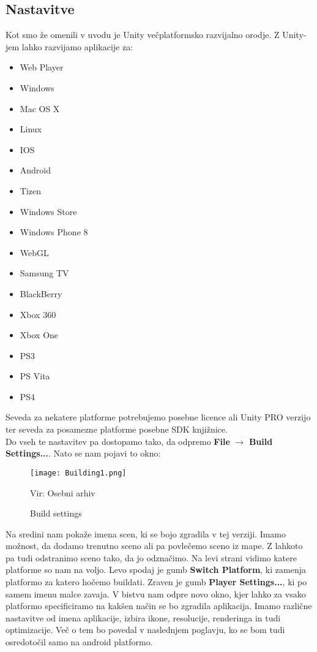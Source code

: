 {\color{indiagreen}\subsection{Nastavitve}}
Kot smo že omenili v uvodu je Unity večplatformsko razvijalno orodje. Z Unity-jem lahko razvijamo aplikacije za:
\begin{itemize}
	\item Web Player
	\item Windows
	\item Mac OS X
	\item Linux
	\item IOS
	\item Android
	\item Tizen
	\item Windows Store
	\item Windows Phone 8
	\item WebGL
	\item Samsung TV
	\item BlackBerry
	\item Xbox 360
	\item Xbox One
	\item PS3
	\item PS Vita
	\item PS4
\end{itemize}
Seveda za nekatere platforme potrebujemo posebne licence ali Unity PRO verzijo ter seveda za posamezne platforme posebne SDK knjižnice.\\
Do vseh te nastavitev pa dostopamo tako, da odpremo \textbf{File} $\rightarrow$ \textbf{Build Settings...}. Nato se nam pojavi to okno:\\
\begin{figure}[ht!]
	\centering
	\texttt{[image: Building1.png]}
	\caption{Build settings}
	{\tiny Vir: Osebni arhiv}
\end{figure}
Na sredini nam pokaže imena scen, ki se bojo zgradila v tej verziji. Imamo možnost, da dodamo trenutno sceno ali pa povlečemo sceno iz mape. Z lahkoto pa tudi odstranimo sceno tako, da jo odznačimo. Na levi strani vidimo katere platforme so nam na voljo. Levo spodaj je gumb \textbf{Switch Platform}, ki zamenja platformo za katero hočemo buildati. Zraven je gumb \textbf{Player Settings...}, ki po samem imenu malce zavaja. V bistvu nam odpre novo okno, kjer lahko za vsako platformo specificiramo na kakšen način se bo zgradila aplikacija. Imamo različne nastavitve od imena aplikacije, izbira ikone, resolucije, renderinga in tudi optimizacije. Več o tem bo povedal v naslednjem poglavju, ko se bom tudi osredotočil samo na android platformo.\\
